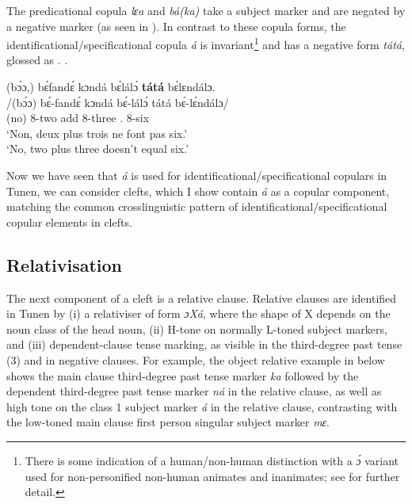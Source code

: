 \documentclass[output=paper,colorlinks,citecolor=brown
]{langscibook}
\begin{document}
The predicational copula \textit{lɛa} and \textit{bá(ka)} take a subject marker and are negated by a negative marker (as seen in ). In contrast to these copula forms, the identificational/specifica\-tional copula \textit{á} is invariant\footnote{There is some indication of a human/non-human distinction with a \textit{ɔ́} variant used for non-personified non-human animates and inanimates; see \citet[120]{KerrFut} for further detail.\label{footnote18}} and has a negative form \textit{tátá}, glossed as \COP{}.\NEG{} .

\ea
\label{twoplusthree}
\glll
{\db}(bɔ́ɔ,) bɛ́fandɛ́ kɔndá bɛ́lálɔ́ \textbf{tátá} bɛ́lɛndálɔ. \\
/(bɔ́ɔ) bɛ́-fandɛ́ kɔndá bɛ́-lálɔ́ tátá bɛ́-lɛ́ndálɔ/ \\
{\db}(no) 8-two add 8-three \COP{}.\NEG{} 8-six \\
\glt
`Non, deux plus trois ne font pas six.' \\ `No, two plus three doesn't equal six.' \jambox*{[PM 784] }

\z

Now we have seen that \textit{á} \COP{} is used for identificational/specificational copulars in Tunen, we can consider clefts, which I show contain \textit{á} as a copular component, matching the common crosslinguistic pattern of identificational/specifica\-tional copular elements in clefts.

\subsection{Relativisation}
The next component of a cleft is a relative clause. Relative clauses are identified in Tunen by (i) a relativiser of form \textit{ɔXá}, where the shape of X depends on the noun class of the head noun, (ii) H-tone on normally L-toned subject markers, and (iii) dependent-clause tense marking, as visible in the third-degree past tense (\PST{}3{}) and in negative clauses. For example, the object relative example in  below shows the main clause third-degree past tense marker \textit{ka} followed by the dependent third-degree past tense marker \textit{\ds{}ná} in the relative clause, as well as high tone on the class 1 subject marker \textit{á} in the relative clause, contrasting with the low-toned main clause first person singular subject marker \textit{mɛ}.
\end{document}
